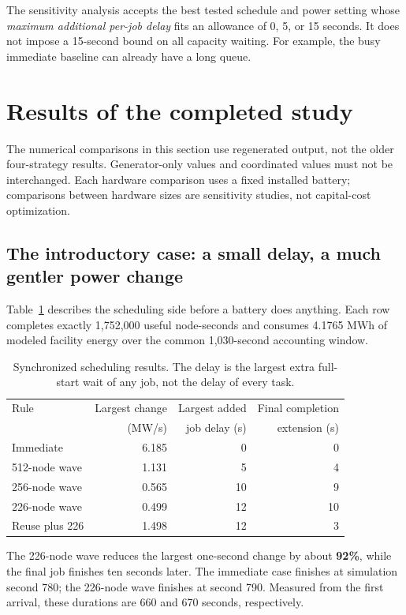 \documentclass[11pt]{article}
\begin{document}
The sensitivity analysis accepts the best tested schedule and power setting
whose \emph{maximum additional per-job delay} fits an allowance of 0, 5, or
15 seconds. It does not impose a 15-second bound on all capacity waiting.
For example, the busy immediate baseline can already have a long queue.

\section{Results of the completed study}
\label{sec:results}

The numerical comparisons in this section use regenerated output, not the
older four-strategy results. Generator-only values and coordinated values
must not be interchanged. Each hardware comparison uses a fixed installed
battery; comparisons between hardware sizes are sensitivity studies, not
capital-cost optimization.

\subsection{The introductory case: a small delay, a much gentler power change}

Table~\ref{tab:scheduling} describes the scheduling side before a battery
does anything. Each row completes exactly 1,752,000 useful node-seconds
and consumes 4.1765 MWh of modeled facility energy over the common
1,030-second accounting window.

\begin{table}[H]
\centering
\small
\begin{tabular}{lrrr}
\toprule
Rule & Largest change & Largest added & Final completion\\
 & (MW/s) & job delay (s) & extension (s)\\
\midrule
Immediate & 6.185 & 0 & 0\\
512-node wave & 1.131 & 5 & 4\\
256-node wave & 0.565 & 10 & 9\\
226-node wave & 0.499 & 12 & 10\\
Reuse plus 226 & 1.498 & 12 & 3\\
\bottomrule
\end{tabular}
\caption{Synchronized scheduling results. The delay is the largest extra
full-start wait of any job, not the delay of every task.}
\label{tab:scheduling}
\end{table}

The 226-node wave reduces the largest one-second change by about
\textbf{92\%}, while the final job finishes ten seconds later. The
immediate case finishes at simulation second 780; the 226-node wave
finishes at second 790. Measured from the first arrival, these durations
are 660 and 670 seconds, respectively.
\end{document}
